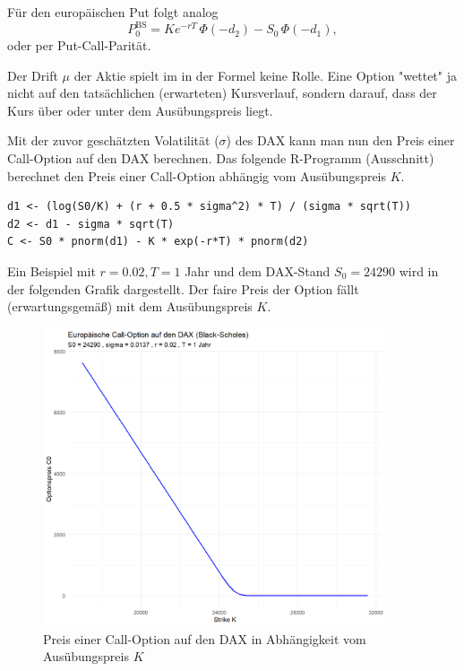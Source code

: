 \begin{bem}
Für den europäischen Put folgt analog
$$
P_0^{\mathrm{BS}} = K e^{-rT}\,\Phi(-d_2) - S_0\,\Phi(-d_1),
$$
oder per Put-Call-Parität.

\end{bem}
\begin{bem}

Der Drift $\mu$ der Aktie spielt im in der Formel keine Rolle.
Eine Option "wettet" ja nicht auf den tatsächlichen (erwarteten) Kursverlauf, sondern darauf,
dass der Kurs über oder unter dem Ausübungspreis liegt.

\end{bem}

\begin{bsp}
Mit der zuvor geschätzten Volatilität ($\sigma$) des DAX kann
man nun den Preis einer Call-Option auf den DAX berechnen. Das folgende
R-Programm (Ausschnitt) berechnet den Preis einer Call-Option abhängig
vom Ausübungspreis $K$.

\begin{lstlisting}
d1 <- (log(S0/K) + (r + 0.5 * sigma^2) * T) / (sigma * sqrt(T))
d2 <- d1 - sigma * sqrt(T)
C <- S0 * pnorm(d1) - K * exp(-r*T) * pnorm(d2)
\end{lstlisting}
Ein Beispiel mit $r = 0.02, T = 1$ Jahr und dem DAX-Stand $S_0 = 24290$ wird in
der folgenden Grafik dargestellt. Der faire Preis der Option
fällt (erwartungsgemäß) mit dem Ausübungspreis $K$.


\begin{figure}[H]
    \centering
    \includegraphics[width=0.9\textwidth]{images/call_dax_bs.png}
    \caption{Preis einer Call-Option auf den DAX in Abhängigkeit vom Ausübungspreis $K$}
    \label{fig:call_dax_bs}
\end{figure}

\end{bsp}

